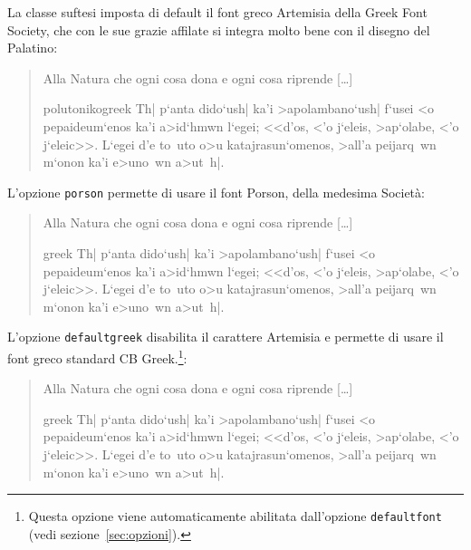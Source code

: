 \documentclass{suftesi}
\newcommand{\omissis}{[\dots\negthinspace]}
\newcommand*{\option}{\texttt}
\def\suftesi{\textsf{suftesi}}
\begin{document}
La classe \suftesi{} imposta di default il font greco Artemisia
della Greek Font Society, che con le sue grazie affilate si integra molto bene con il disegno del Palatino:
\begin{quotation}
Alla Natura che ogni cosa dona e ogni cosa riprende \omissis{} 
\begin{otherlanguage*}{polutonikogreek}%
\selectfont
Th| p`anta dido`ush|
ka'i >apolambano`ush| f`usei
<o pepaideum`enos ka'i
a>id`hmwn l`egei; <<d'os, <'o
j`eleis, >ap`olabe, <'o
j`eleic>>. L`egei d'e to~uto
o>u katajrasun`omenos, >all'a
peijarq~wn m`onon ka'i
e>uno~wn a>ut~h|.
 \end{otherlanguage*}
\end{quotation}
L'opzione \option{porson} permette di usare il font Porson, della
medesima Società:
\begin{quotation}
Alla Natura che ogni cosa dona e ogni cosa riprende \omissis{} 
\begin{otherlanguage*}{greek}%
\selectfont
Th| p`anta dido`ush|
ka'i >apolambano`ush| f`usei
<o pepaideum`enos ka'i
a>id`hmwn l`egei; <<d'os, <'o
j`eleis, >ap`olabe, <'o
j`eleic>>. L`egei d'e to~uto
o>u katajrasun`omenos, >all'a
peijarq~wn m`onon ka'i
e>uno~wn a>ut~h|.%
 \end{otherlanguage*}
 \end{quotation}
L'opzione \option{defaultgreek} disabilita il carattere Artemisia e
permette di usare il font greco standard CB Greek.\footnote{Questa opzione viene automaticamente abilitata dall'opzione \option{defaultfont} (vedi sezione~\ref{sec:opzioni}).}:
\begin{quotation}
Alla Natura che ogni cosa dona e ogni cosa riprende \omissis{} 
\begin{otherlanguage*}{greek}%
\selectfont
Th| p`anta dido`ush|
ka'i >apolambano`ush| f`usei
<o pepaideum`enos ka'i
a>id`hmwn l`egei; <<d'os, <'o
j`eleis, >ap`olabe, <'o
j`eleic>>. L`egei d'e to~uto
o>u katajrasun`omenos, >all'a
peijarq~wn m`onon ka'i
e>uno~wn a>ut~h|.%
 \end{otherlanguage*}
 \end{quotation}
 
\end{document}
